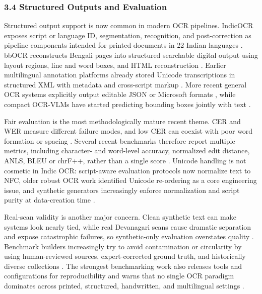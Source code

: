     
    \subsubsection*{3.4 Structured Outputs and Evaluation}
    
    
    Structured output support is now common in modern OCR pipelines. IndicOCR exposes script or language ID, segmentation, recognition, and post-correction as pipeline components intended for printed documents in 22 Indian languages  \cite{Tulsyan2024IndicOCR:}. bbOCR reconstructs Bengali pages into structured searchable digital output using layout regions, line and word boxes, and HTML reconstruction  \cite{Zulkarnain2023bbOCR:}. Earlier multilingual annotation platforms already stored Unicode transcriptions in structured XML with metadata and cross-script markup  \cite{Govindaraju2004Tools}. More recent general OCR systems explicitly output editable JSON or Microsoft formats  \cite{Li2025Printed}, while compact OCR-VLMs have started predicting bounding boxes jointly with text  \cite{Taghadouini2026LightOnOCR:} \cite{Hamdi2025PILOT:}.
    
    
    Fair evaluation is the most methodologically mature recent theme. CER and WER measure different failure modes, and low CER can coexist with poor word formation or spacing  \cite{Sivashanth2026Comprehensive} \cite{Jayatilleke2025Zero-shot}. Several recent benchmarks therefore report multiple metrics, including character- and word-level accuracy, normalized edit distance, ANLS, BLEU or chrF++, rather than a single score  \cite{Caravani2026Assessing} \cite{Jayatilleke2025Zero-shot} \cite{Zulkarnain2023bbOCR:}. Unicode handling is not cosmetic in Indic OCR: script-aware evaluation protocols now normalize text to NFC, older robust OCR work identified Unicode re-ordering as a core engineering issue, and synthetic generators increasingly enforce normalization and script purity at data-creation time  \cite{Singh2026Can} \cite{Krishnan2014Towards} \cite{Malik2026synthocr-gen:}.
    
    
    Real-scan validity is another major concern. Clean synthetic text can make systems look nearly tied, while real Devanagari scans cause dramatic separation and expose catastrophic failures, so synthetic-only evaluation overstates quality  \cite{Singh2026Can}. Benchmark builders increasingly try to avoid contamination or circularity by using human-reviewed sources, expert-corrected ground truth, and historically diverse collections  \cite{Faraz2025IndicVisionBench:} \cite{Sivashanth2026Comprehensive}. The strongest benchmarking work also releases tools and configurations for reproducibility and warns that no single OCR paradigm dominates across printed, structured, handwritten, and multilingual settings  \cite{Caravani2026Assessing} \cite{Tulsyan2020A}.
    
